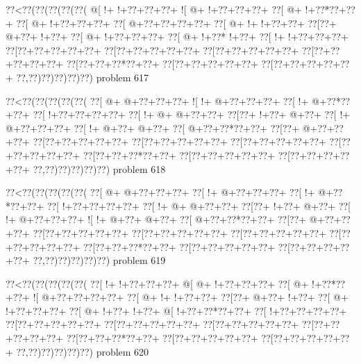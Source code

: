 \vbox{\vbox{\goo
\0??<\0??(\0??(\0??(\0??(\0??(
\- @[\- !+\- !+\0??+\0??+\0??+
\- ![\- @+\- !+\0??+\0??+\0??+
\0??[\- @+\- !+\0??*\0??+\0??+
\0??[\- @+\- !+\0??+\0??+\0??+
\0??[\- @+\0??+\0??+\0??+\0??+
\0??[\- @+\- !+\- !+\0??+\0??+
\0??[\0??+\- @+\0??+\- !+\0??+
\0??[\- @+\- !+\0??+\0??+\0??+
\0??[\- @+\- !+\0??*\- !+\0??+
\0??[\- !+\- !+\0??+\0??+\0??+
\0??[\0??+\0??+\0??+\0??+\0??+
\0??[\0??+\0??+\0??+\0??+\0??+
\0??[\0??+\0??+\0??+\0??+\0??+
\0??[\0??+\0??+\0??+\0??+\0??+
\0??[\0??+\0??+\0??*\0??+\0??+
\0??[\0??+\0??+\0??+\0??+\0??+
\0??[\0??+\0??+\0??+\0??+\0??+
\0??,\0??)\0??)\0??)\0??)\0??)
}
\hfil problem 617\hfil\break
}

\vbox{\vbox{\goo
\0??<\0??(\0??(\0??(\0??(\0??(
\0??[\- @+\- @+\0??+\0??+\0??+
\- ![\- !+\- @+\0??+\0??+\0??+
\0??[\- !+\- @+\0??*\0??+\0??+
\0??[\- !+\0??+\0??+\0??+\0??+
\0??[\- !+\- @+\- @+\0??+\0??+
\0??[\0??+\- !+\0??+\- @+\0??+
\0??[\- !+\- @+\0??+\0??+\0??+
\0??[\- !+\- @+\0??+\- @+\0??+
\0??[\- @+\0??+\0??*\0??+\0??+
\0??[\0??+\- @+\0??+\0??+\0??+
\0??[\0??+\0??+\0??+\0??+\0??+
\0??[\0??+\0??+\0??+\0??+\0??+
\0??[\0??+\0??+\0??+\0??+\0??+
\0??[\0??+\0??+\0??+\0??+\0??+
\0??[\0??+\0??+\0??*\0??+\0??+
\0??[\0??+\0??+\0??+\0??+\0??+
\0??[\0??+\0??+\0??+\0??+\0??+
\0??,\0??)\0??)\0??)\0??)\0??)
}
\hfil problem 618\hfil\break
}

\vbox{\vbox{\goo
\0??<\0??(\0??(\0??(\0??(\0??(
\0??[\- @+\- @+\0??+\0??+\0??+
\0??[\- !+\- @+\0??+\0??+\0??+
\0??[\- !+\- @+\0??*\0??+\0??+
\0??[\- !+\0??+\0??+\0??+\0??+
\0??[\- !+\- @+\- @+\0??+\0??+
\0??[\0??+\- !+\0??+\- @+\0??+
\0??[\- !+\- @+\0??+\0??+\0??+
\- ![\- !+\- @+\0??+\- @+\0??+
\0??[\- @+\0??+\0??*\0??+\0??+
\0??[\0??+\- @+\0??+\0??+\0??+
\0??[\0??+\0??+\0??+\0??+\0??+
\0??[\0??+\0??+\0??+\0??+\0??+
\0??[\0??+\0??+\0??+\0??+\0??+
\0??[\0??+\0??+\0??+\0??+\0??+
\0??[\0??+\0??+\0??*\0??+\0??+
\0??[\0??+\0??+\0??+\0??+\0??+
\0??[\0??+\0??+\0??+\0??+\0??+
\0??,\0??)\0??)\0??)\0??)\0??)
}
\hfil problem 619\hfil\break
}

\vbox{\vbox{\goo
\0??<\0??(\0??(\0??(\0??(\0??(
\0??[\- !+\- !+\0??+\0??+\0??+
\- @[\- @+\- !+\0??+\0??+\0??+
\0??[\- @+\- !+\0??*\0??+\0??+
\- ![\- @+\0??+\0??+\0??+\0??+
\0??[\- @+\- !+\- !+\0??+\0??+
\0??[\0??+\- @+\0??+\- !+\0??+
\0??[\- @+\- !+\0??+\0??+\0??+
\0??[\- @+\- !+\0??+\- !+\0??+
\- @[\- !+\0??+\0??*\0??+\0??+
\0??[\- !+\0??+\0??+\0??+\0??+
\0??[\0??+\0??+\0??+\0??+\0??+
\0??[\0??+\0??+\0??+\0??+\0??+
\0??[\0??+\0??+\0??+\0??+\0??+
\0??[\0??+\0??+\0??+\0??+\0??+
\0??[\0??+\0??+\0??*\0??+\0??+
\0??[\0??+\0??+\0??+\0??+\0??+
\0??[\0??+\0??+\0??+\0??+\0??+
\0??,\0??)\0??)\0??)\0??)\0??)
}
\hfil problem 620\hfil\break
}

